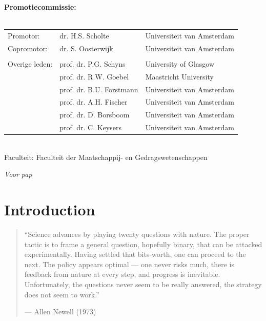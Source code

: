 \documentclass[11pt,american,a4paper,oneside,]{memoir} %
\begin{document}
\clearpage
\thispagestyle{empty}
\noindent\textbf{Promotiecommissie:}\\
\\
\noindent\begin{tabular}{@{}lll}

Promotor:
&  dr. H.S. Scholte & Universiteit van Amsterdam\\

Copromotor:
&  dr. S. Oosterwijk & Universiteit van Amsterdam\\

\\
Overige leden:
&  prof. dr. P.G. Schyns & University of Glasgow\\
&  prof. dr. R.W. Goebel & Maastricht University\\
&  prof. dr. B.U. Forstmann & Universiteit van Amsterdam\\
&  prof. dr. A.H. Fischer & Universiteit van Amsterdam\\
&  prof. dr. D. Borsboom & Universiteit van Amsterdam\\
&  prof. dr. C. Keysers & Universiteit van Amsterdam\\
\end{tabular}\\

\noindent Faculteit: Faculteit der Maatschappij- en Gedragswetenschappen

\clearpage
\vspace*{\fill}
\begin{center}
\begin{minipage}{.6\textwidth}
\centerline{\emph{\huge Voor pap}}
\end{minipage}
\end{center}
\vfill %
\cleardoublepage



\clearpage
\thispagestyle{empty}
{
\hypersetup{linkcolor=black}
\setcounter{tocdepth}{1}
\tableofcontents
}
\mainmatter
\hypertarget{general-introduction}{%
\chapter{Introduction}\label{general-introduction}}

\begin{quote}
``Science advances by playing twenty questions with nature.
The proper tactic is to frame a general question, hopefully binary,
that can be attacked experimentally. Having settled that bits-worth,
one can proceed to the next. The policy appears optimal --- one never risks much,
there is feedback from nature at every step, and progress is inevitable.
Unfortunately, the questions never seem to be really answered,
the strategy does not seem to work.''

\hfill --- Allen Newell (1973)
\end{quote}
\end{document}
